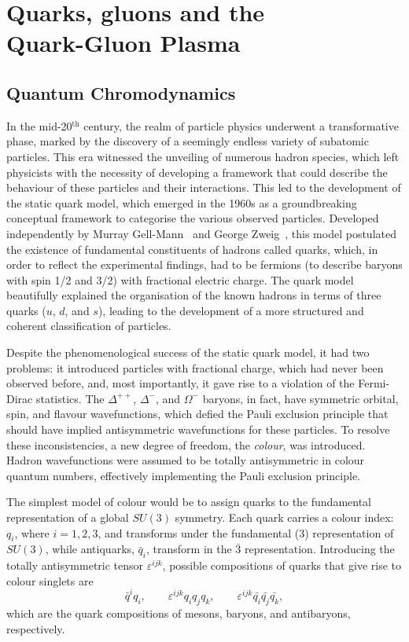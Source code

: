 \chapter[Quarks, gluons and the Quark-Gluon Plasma]{Quarks, gluons and the\\ Quark-Gluon Plasma}\label{ch:QGP}
\section{Quantum Chromodynamics}
In the mid-20$^{\mathrm{th}}$ century, the realm of particle physics underwent a transformative phase, marked by the discovery of a seemingly endless variety of subatomic particles. This era witnessed the unveiling of numerous hadron species, which left physicists with the necessity of developing a framework that could describe the behaviour of these particles and their interactions. This led to the development of the static quark model, which emerged in the 1960s as a groundbreaking conceptual framework to categorise the various observed particles. Developed independently by Murray Gell-Mann~\cite{Gell-Mann:1964ewy} and George Zweig~\cite{Zweig:1964jf, Fritzsch:1972jv}, this model postulated the existence of fundamental constituents of hadrons called quarks, which, in order to reflect the experimental findings, had to be fermions (to describe baryons with spin 1/2 and 3/2) with fractional electric charge. The quark model beautifully explained the organisation of the known hadrons in terms of three quarks ($u$, $d$, and $s$), leading to the development of a more structured and coherent classification of particles.

Despite the phenomenological success of the static quark model, it had two problems: it introduced particles with fractional charge, which had never been observed before, and, most importantly, it gave rise to a violation of the Fermi-Dirac statistics. The $\Delta^{++}$, $\Delta^{-}$, and $\Omega^{-}$ baryons, in fact, have symmetric orbital, spin, and flavour wavefunctions, which defied the Pauli exclusion principle that should have implied antisymmetric wavefunctions for these particles. To resolve these inconsistencies, a new degree of freedom, the \emph{colour}, was introduced. Hadron wavefunctions were assumed to be totally antisymmetric in colour quantum numbers, effectively implementing the Pauli exclusion principle.

The simplest model of colour would be to assign quarks to the fundamental representation of a global $SU(3)$ symmetry. Each quark carries a colour index: $q_i$, where $i = 1, 2, 3$, and transforms under the fundamental ($3$) representation of $SU(3)$, while antiquarks,  $\bar{q}_i$, transform in the $\bar{3}$ representation. Introducing the totally antisymmetric tensor $\varepsilon^{ijk}$, possible compositions of quarks that give rise to colour singlets are 
\begin{equation*}
    \bar{q}^iq_i,\qquad \varepsilon^{ijk}q_iq_jq_k,\qquad \varepsilon^{ijk}\bar{q_i}\bar{q_j}\bar{q_k},
\end{equation*}
which are the quark compositions of mesons, baryons, and antibaryons, respectively. 

